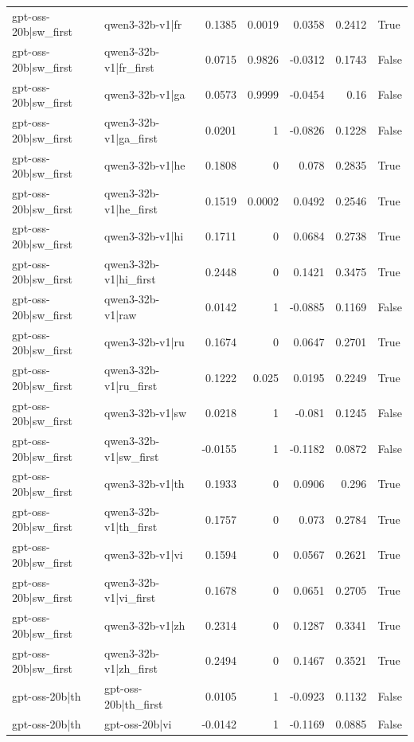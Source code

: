 \begin{table}
\begin{tabular}{l l r r r r l}
gpt-oss-20b|sw_first & qwen3-32b-v1|fr & 0.1385 & 0.0019 & 0.0358 & 0.2412 & True \\
gpt-oss-20b|sw_first & qwen3-32b-v1|fr_first & 0.0715 & 0.9826 & -0.0312 & 0.1743 & False \\
gpt-oss-20b|sw_first & qwen3-32b-v1|ga & 0.0573 & 0.9999 & -0.0454 & 0.16 & False \\
gpt-oss-20b|sw_first & qwen3-32b-v1|ga_first & 0.0201 & 1 & -0.0826 & 0.1228 & False \\
gpt-oss-20b|sw_first & qwen3-32b-v1|he & 0.1808 & 0 & 0.078 & 0.2835 & True \\
gpt-oss-20b|sw_first & qwen3-32b-v1|he_first & 0.1519 & 0.0002 & 0.0492 & 0.2546 & True \\
gpt-oss-20b|sw_first & qwen3-32b-v1|hi & 0.1711 & 0 & 0.0684 & 0.2738 & True \\
gpt-oss-20b|sw_first & qwen3-32b-v1|hi_first & 0.2448 & 0 & 0.1421 & 0.3475 & True \\
gpt-oss-20b|sw_first & qwen3-32b-v1|raw & 0.0142 & 1 & -0.0885 & 0.1169 & False \\
gpt-oss-20b|sw_first & qwen3-32b-v1|ru & 0.1674 & 0 & 0.0647 & 0.2701 & True \\
gpt-oss-20b|sw_first & qwen3-32b-v1|ru_first & 0.1222 & 0.025 & 0.0195 & 0.2249 & True \\
gpt-oss-20b|sw_first & qwen3-32b-v1|sw & 0.0218 & 1 & -0.081 & 0.1245 & False \\
gpt-oss-20b|sw_first & qwen3-32b-v1|sw_first & -0.0155 & 1 & -0.1182 & 0.0872 & False \\
gpt-oss-20b|sw_first & qwen3-32b-v1|th & 0.1933 & 0 & 0.0906 & 0.296 & True \\
gpt-oss-20b|sw_first & qwen3-32b-v1|th_first & 0.1757 & 0 & 0.073 & 0.2784 & True \\
gpt-oss-20b|sw_first & qwen3-32b-v1|vi & 0.1594 & 0 & 0.0567 & 0.2621 & True \\
gpt-oss-20b|sw_first & qwen3-32b-v1|vi_first & 0.1678 & 0 & 0.0651 & 0.2705 & True \\
gpt-oss-20b|sw_first & qwen3-32b-v1|zh & 0.2314 & 0 & 0.1287 & 0.3341 & True \\
gpt-oss-20b|sw_first & qwen3-32b-v1|zh_first & 0.2494 & 0 & 0.1467 & 0.3521 & True \\
gpt-oss-20b|th & gpt-oss-20b|th_first & 0.0105 & 1 & -0.0923 & 0.1132 & False \\
gpt-oss-20b|th & gpt-oss-20b|vi & -0.0142 & 1 & -0.1169 & 0.0885 & False \\

\end{tabular}
\end{table}
